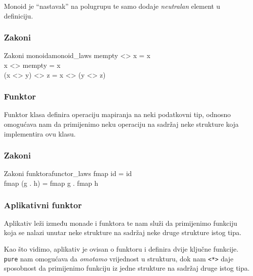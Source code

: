 Monoid je ``nastavak'' na polugrupu te samo dodaje \textit{neutralan} element u definiciju.


\subsubsection*{Zakoni}

\begin{code}{Zakoni monoida}{monoid_laws}
    mempty <> x = x\\
    x <> mempty = x\\
    (x <> y) <> z = x <> (y <> z)
\end{code}

\subsubsection{Funktor}

Funktor klasa definira operaciju mapiranja na neki podatkovni tip, odnosno omogućava nam da primijenimo neku operaciju na sadržaj neke strukture koja implementira ovu klasu.


\subsubsection*{Zakoni}

\begin{code}{Zakoni funktora}{functor_laws}
    fmap id = id\\
    fmap (g . h) = fmap g . fmap h
\end{code}

\subsubsection{Aplikativni funktor}

Aplikativ leži između monade i funktora te nam služi da primijenimo funkciju koja se nalazi unutar neke strukture na sadržaj neke druge strukture istog tipa.


Kao što vidimo, aplikativ je ovisan o funktoru i definira dvije ključne funkcije. \texttt{pure} nam omogućava da \textit{omotamo} vrijednost u strukturu, dok nam \texttt{<*>} daje sposobnost da primijenimo funkciju iz jedne strukture na sadržaj druge istog tipa.

